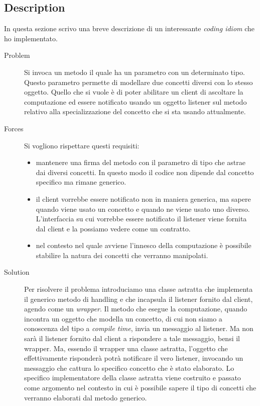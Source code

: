 \subsection*{Description}
In questa sezione scrivo una breve descrizione di un interessante
\emph{coding idiom} che ho implementato.
\begin{description}
\item[Problem] Si invoca un metodo il quale ha un parametro con un
  determinato tipo. Questo parametro permette di modellare due
  concetti diversi con lo stesso oggetto. Quello che si vuole \`e di
  poter abilitare un client di ascoltare la computazione ed essere
  notificato usando un oggetto listener sul metodo relativo alla
  specializzazione del concetto che si sta usando attualmente.
\item[Forces] Si vogliono rispettare questi requisiti:
  \begin{itemize}
  \item mantenere una firma del metodo con il parametro di tipo che
    astrae dai diversi concetti. In questo modo il codice non dipende
    dal concetto specifico ma rimane generico.
  \item il client vorrebbe essere notificato non in maniera generica,
    ma sapere quando viene usato un concetto e quando ne viene usato
    uno diverso. L'interfaccia su cui vorrebbe essere notificato il
    listener viene fornita dal client e la possiamo vedere come un
    contratto. 
  \item nel contesto nel quale avviene l'innesco della computazione
    \`e possibile stabilire la natura dei concetti che verranno
    manipolati.
  \end{itemize}
\item[Solution] Per risolvere il problema introduciamo una classe
  astratta che implementa il generico metodo di handling e che
  incapsula il listener fornito dal client, agendo come un
  \emph{wrapper}. Il metodo che esegue la computazione, quando
  incontra un oggetto che modella un concetto, di cui non siamo a
  conoscenza del tipo a \emph{compile time}, invia un messaggio al
  listener. Ma non sar\`a il listener fornito dal client a rispondere
  a tale messaggio, bensi il wrapper. Ma, essendo il wrapper una
  classe astratta, l'oggetto che effettivamente risponder\`a potr\`a
  notificare il vero listener, invocando un messaggio che cattura lo
  specifico concetto che \`e stato elaborato. Lo specifico
  implementatore della classe astratta viene costruito e passato come
  argomento nel contesto in cui \`e possibile sapere il tipo di
  concetti che verranno elaborati dal metodo generico.
\end{description}

